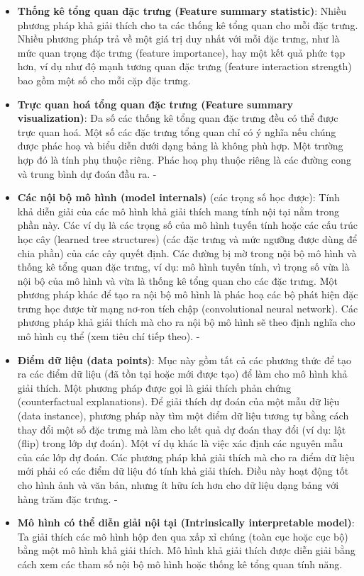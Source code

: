\begin{itemize}
\item \textbf{Thống kê tổng quan đặc trưng (Feature summary statistic)}: Nhiều phương pháp khả giải thích cho ta các thống kê tổng quan cho mỗi đặc trưng. Nhiều phương pháp trả về một giá trị duy nhất với mỗi đặc trưng, như là mức quan trọng đặc trưng (feature importance), hay một kết quả phức tạp hơn, ví dụ như độ mạnh tương quan đặc trưng (feature interaction strength) bao gồm một số cho mỗi cặp đặc trưng.

\item \textbf{Trực quan hoá tổng quan đặc trưng (Feature summary visualization)}: Đa số các thống kê tổng quan đặc trưng đều có thể được trực quan hoá. Một số các đặc trưng tổng quan chỉ có ý nghĩa nếu chúng được phác hoạ và biểu diễn dưới dạng bảng là không phù hợp. Một trường hợp đó là tính phụ thuộc riêng. Phác hoạ phụ thuộc riêng là các đường cong và trung bình dự đoán đầu ra. 
-	\item \textbf{Các nội bộ mô hình (model internals)} (các trọng số học được): Tính khả diễn giải của các mô hình khả giải thích mang tính nội tại nằm trong phần này. Các ví dụ là các trọng số của mô hình tuyến tính hoặc các cấu trúc học cây (learned tree structures) (các đặc trưng và mức ngưỡng được dùng để chia phần) của các cây quyết định. Các đường bị mờ trong nội bộ mô hình và thống kê tổng quan đặc trưng, ví dụ: mô hình tuyến tính, vì trọng số vừa là nội bộ của mô hình và vừa là thống kê tổng quan cho các đặc trưng. Một phương pháp khác để tạo ra nội bộ mô hình là phác hoạ các bộ phát hiện đặc trưng học được từ mạng nơ-ron tích chập (convolutional neural network). Các phương pháp khả giải thích mà cho ra nội bộ mô hình sẽ theo định nghĩa cho mô hình cụ thể (xem tiêu chí tiếp theo). 
-	\item \textbf{Điểm dữ liệu (data points)}: Mục này gồm tất cả các phương thức để tạo ra các điểm dữ liệu (đã tồn tại hoặc mới được tạo) để làm cho mô hình khả giải thích. Một phương pháp được gọi là giải thích phản chứng (counterfactual explanations). Để giải thích dự đoán của một mẫu dữ liệu (data instance), phương pháp này tìm một điểm dữ liệu tương tự bằng cách thay đổi một số đặc trưng mà làm cho kết quả dự đoán thay đổi (ví dụ: lật (flip) trong lớp dự đoán). Một ví dụ khác là việc xác định các nguyên mẫu của các lớp dự đoán. Các phương pháp khả giải thích mà cho ra điểm dữ liệu mới phải có các điểm dữ liệu đó tính khả giải thích. Điều này hoạt động tốt cho hình ảnh và văn bản, nhưng ít hữu ích hơn cho dữ liệu dạng bảng với hàng trăm đặc trưng.
-	\item \textbf{Mô hình có thể diễn giải nội tại (Intrinsically interpretable model)}: Ta giải thích các mô hình hộp đen qua xấp xỉ chúng (toàn cục hoặc cục bộ) bằng một mô hình khả giải thích. Mô hình khả giải thích được diễn giải bằng cách xem các tham số nội bộ mô hình hoặc thống kê tổng quan tính năng.

\end{itemize}


